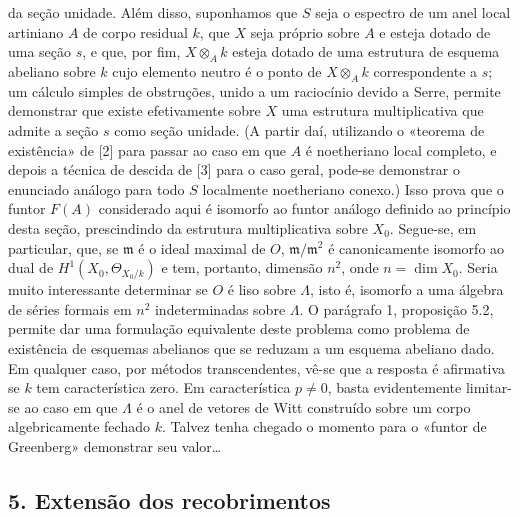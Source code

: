 \documentclass[11pt,twoside,openany]{book}
\numberwithin{equation}{section}
\newcommand{\src}[1]{%
  \phantomsection\hypertarget{src:#1}{}%
  \marginpar{\raggedleft\footnotesize\sffamily #1}%
}
\theoremstyle{plain}
\theoremstyle{definition}
\theoremstyle{remark}
\newcommand{\FgaUnitKey}{frontmatter}
\renewcommand{\src}[1]{%
  \phantomsection\hypertarget{src:\FgaUnitKey:#1}{}%
  \marginpar{\raggedleft\footnotesize\sffamily #1}%
}
\begin{document}
\src{387}
da seção unidade. Além disso, suponhamos que $S$ seja o espectro de um anel
local artiniano $A$ de corpo residual $k$, que $X$ seja próprio sobre $A$ e esteja
dotado de uma seção $s$, e que, por fim, $X\otimes_Ak$ esteja dotado de uma
estrutura de esquema abeliano sobre $k$ cujo elemento neutro é o ponto de
$X\otimes_Ak$ correspondente a $s$; um cálculo simples de obstruções,
unido a um raciocínio devido a Serre, permite demonstrar que existe
efetivamente sobre $X$ uma estrutura multiplicativa que admite a seção
$s$ como seção unidade. (A partir daí, utilizando o «teorema de
existência» de [2] para passar ao caso em que $A$ é noetheriano local completo,
e depois a técnica de descida de [3] para o caso geral, pode-se demonstrar
o enunciado análogo para todo $S$ localmente noetheriano conexo.) Isso prova
que o funtor $F(A)$ considerado aqui é isomorfo ao funtor análogo definido ao
princípio desta seção, prescindindo da estrutura multiplicativa sobre
$X_0$. Segue-se, em particular, que, se $\mathfrak m$ é o ideal maximal de
$O$, $\mathfrak m/\mathfrak m^2$ é canonicamente isomorfo ao dual de
$H^1(X_0,\Theta_{X_0/k})$ e tem, portanto, dimensão $n^2$, onde
$n=\dim X_0$. Seria muito interessante determinar se $O$ é liso sobre $\Lambda$,
isto é, isomorfo a uma álgebra de séries formais em $n^2$ indeterminadas
sobre $\Lambda$. O parágrafo 1, proposição 5.2, permite dar uma formulação
equivalente deste problema como problema de existência de esquemas abelianos
que se reduzam a um esquema abeliano dado. Em qualquer caso, por métodos
transcendentes, vê-se que a resposta é afirmativa se $k$ tem característica
zero. Em característica $p\ne0$, basta evidentemente limitar-se ao caso em que
$\Lambda$ é o anel de vetores de Witt construído sobre um corpo
algebricamente fechado $k$. Talvez tenha chegado o momento para o «funtor
de Greenberg» demonstrar seu valor\ldots

\subsection*{5. Extensão dos recobrimentos}
\end{document}

